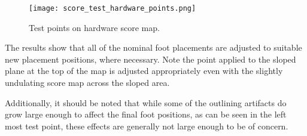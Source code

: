         \newpage
        \begin{figure}[h]
            \centering
            \texttt{[image: score\_test\_hardware\_points.png]}
            \caption{Test points on hardware score map.}
            \label{fig:hardware_test_points}
        \end{figure}

        \noindent
        The results show that all of the nominal foot placements are adjusted to suitable new placement positions, where necessary. Note the point applied to the sloped plane at the top of the map is adjusted appropriately even with the slightly undulating score map across the sloped area.

        Additionally, it should be noted that while some of the outlining artifacts do grow large enough to affect the final foot positions, as can be seen in the
        left most test point, these effects are generally not large enough to be of  concern.



